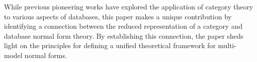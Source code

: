 










While previous pioneering works have explored the application of category theory to various aspects of databases, this paper makes a unique contribution by identifying a connection between the reduced representation of a category and database normal form theory. By establishing this connection, the paper sheds light on the principles for defining a unified theoretical framework for multi-model normal forms. 


